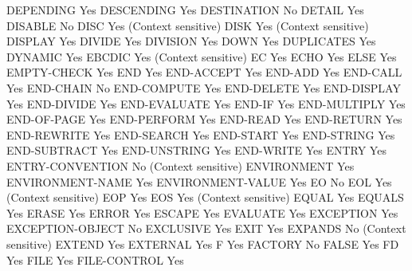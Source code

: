 DEPENDING                       Yes
DESCENDING                      Yes
DESTINATION                     No
DETAIL                          Yes
DISABLE                         No
DISC                            Yes (Context sensitive)
DISK                            Yes (Context sensitive)
DISPLAY                         Yes
DIVIDE                          Yes
DIVISION                        Yes
DOWN                            Yes
DUPLICATES                      Yes
DYNAMIC                         Yes
EBCDIC                          Yes (Context sensitive)
EC                              Yes
ECHO                            Yes
ELSE                            Yes
EMPTY-CHECK                     Yes
END                             Yes
END-ACCEPT                      Yes
END-ADD                         Yes
END-CALL                        Yes
END-CHAIN                       No
END-COMPUTE                     Yes
END-DELETE                      Yes
END-DISPLAY                     Yes
END-DIVIDE                      Yes
END-EVALUATE                    Yes
END-IF                          Yes
END-MULTIPLY                    Yes
END-OF-PAGE                     Yes
END-PERFORM                     Yes
END-READ                        Yes
END-RETURN                      Yes
END-REWRITE                     Yes
END-SEARCH                      Yes
END-START                       Yes
END-STRING                      Yes
END-SUBTRACT                    Yes
END-UNSTRING                    Yes
END-WRITE                       Yes
ENTRY                           Yes
ENTRY-CONVENTION                No (Context sensitive)
ENVIRONMENT                     Yes
ENVIRONMENT-NAME                Yes
ENVIRONMENT-VALUE               Yes
EO                              No
EOL                             Yes (Context sensitive)
EOP                             Yes
EOS                             Yes (Context sensitive)
EQUAL                           Yes
EQUALS                          Yes
ERASE                           Yes
ERROR                           Yes
ESCAPE                          Yes
EVALUATE                        Yes
EXCEPTION                       Yes
EXCEPTION-OBJECT                No
EXCLUSIVE                       Yes
EXIT                            Yes
EXPANDS                         No (Context sensitive)
EXTEND                          Yes
EXTERNAL                        Yes
F                               Yes
FACTORY                         No
FALSE                           Yes
FD                              Yes
FILE                            Yes
FILE-CONTROL                    Yes
